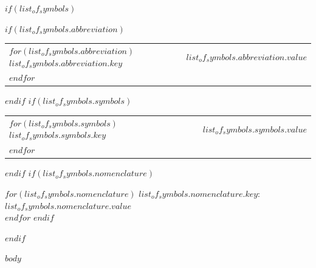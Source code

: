 \documentclass[$if(font_size)$$font_size$$else$12pt$endif$]{book}
\begin{document}
$if(list_of_symbols)$
\newpage
\doublespacing
\begin{flushleft}
    {\large\bfseries{} \par}
    \vspace{.5cm}
    \doublespacing
    $if(list_of_symbols.abbreviation)$
    {\large\bfseries{} \par}
    \vspace{.5cm}
    \begin{longtable}[l]{ll} %
    $for(list_of_symbols.abbreviation)$
    \textbf{$list_of_symbols.abbreviation.key$} & $list_of_symbols.abbreviation.value$ \\
    $endfor$
    \end{longtable}
    $endif$
    $if(list_of_symbols.symbols)$
    {\large\bfseries{} \par}
    \vspace{.5cm}
    \begin{longtable}[l]{ll} %
    $for(list_of_symbols.symbols)$
    \textbf{$list_of_symbols.symbols.key$} & $list_of_symbols.symbols.value$ \\
    $endfor$
    \end{longtable}
    $endif$
    $if(list_of_symbols.nomenclature)$
    {\large\bfseries{} \par}
    \vspace{.5cm}
    $for(list_of_symbols.nomenclature)$
    \textbf{$list_of_symbols.nomenclature.key$}: $list_of_symbols.nomenclature.value$ \\
    $endfor$
    $endif$
\end{flushleft}
$endif$

\newpage
{}
\setcounter{page}{1}
\doublespacing
\setlength{\parindent}{1.5em}
\setlength{\parskip}{0em}
\setcounter{table}{0}
$body$
\end{document}

